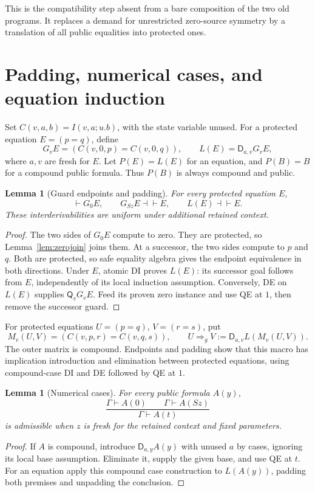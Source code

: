 \documentclass[11pt,letterpaper]{article}
\newtheorem{lemma}[theorem]{Lemma}
\theoremstyle{definition}\newtheorem{definition}[theorem]{Definition}
\theoremstyle{remark}\newtheorem{remark}[theorem]{Remark}
\newcommand{\D}{\mathsf D}\newcommand{\Q}{\mathsf Q}
\newcommand{\eqv}{\mathrel{\dashv\vdash}}
\begin{document}
This is the compatibility step absent from a bare composition of the
two old programs. It replaces a demand for unrestricted zero-source
symmetry by a translation of all public equalities into protected
ones.

\section{Padding, numerical cases, and equation induction}\label{sec:induction}

Set \(C(v,a,b)=I(v,a;u.b)\), with the state variable unused. For a
protected equation \(E=(p=q)\), define
\[
 G_vE=(C(v,0,p)=C(v,0,q)),\qquad
 L(E)=\D_{a,v}G_vE,
\]
where \(a,v\) are fresh for \(E\). Let \(P(E)=L(E)\) for an
equation, and \(P(B)=B\) for a compound public formula. Thus
\(P(B)\) is always compound and public.

\begin{lemma}[Guard endpoints and padding]\label{lem:pad}
For every protected equation \(E\),
\[
 \vdash G_0E,\qquad G_{Sz}E\eqv E,\qquad L(E)\eqv E.
\]
These interderivabilities are uniform under additional retained context.
\end{lemma}
\begin{proof}
The two sides of \(G_0E\) compute to zero. They are protected,
so Lemma~\ref{lem:zerojoin} joins them. At a successor, the two sides
compute to \(p\) and \(q\). Both are protected, so safe equality
algebra gives the endpoint equivalence in both directions.
Under \(E\), atomic DI proves \(L(E)\): its successor goal follows
from \(E\), independently of its local induction assumption.
Conversely, DE on \(L(E)\) supplies \(\Q_vG_vE\). Feed its proven
zero instance and use QE at \(1\), then remove the successor guard.
\end{proof}

For protected equations \(U=(p=q)\), \(V=(r=s)\), put
\[
 M_v(U,V)=(C(v,p,r)=C(v,q,s)),\qquad
 U\Rightarrow_g V:=\D_{a,v}L(M_v(U,V)).
\]
The outer matrix is compound. Endpoints and padding show that this
macro has implication introduction and elimination between protected
equations, using compound-case DI and DE followed by QE at \(1\).

\begin{lemma}[Numerical cases]\label{lem:cases}
For every public formula \(A(y)\),
\[
 \frac{\Gamma\vdash A(0)\qquad\Gamma\vdash A(Sz)}
      {\Gamma\vdash A(t)}
\]
is admissible when \(z\) is fresh for the retained context and fixed
parameters.
\end{lemma}
\begin{proof}
If \(A\) is compound, introduce \(\D_{a,y}A(y)\) with unused
\(a\) by cases, ignoring its local base assumption. Eliminate it,
supply the given base, and use QE at \(t\). For an equation apply
this compound case construction to \(L(A(y))\), padding both
premises and unpadding the conclusion.
\end{proof}
\end{document}
